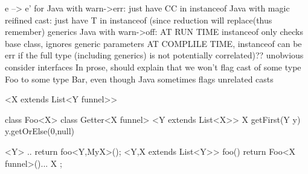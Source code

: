   e --> e' for 
  Java with warn->err: just have CC in instanceof
  Java with magic reifined cast: just have T in instanceof (since reduction will replace(thus remember) generics
  Java with warn->off:
        AT RUN TIME instanceof only checks base class, ignores generic parameters
        AT COMPLILE TIME, instanceof can be err if the full type (including generics) is not potentially correlated)?? unobvious consider interfaces
        In prose, should explain that we won't flag cast of some type Foo to some type Bar, even though Java sometimes flags unrelated casts

<X extends List<Y funnel>>

class Foo<X> {
    class Getter<X funnel> {
        <Y extends List<X>> X getFirst(Y y) { y.getOrElse(0,null) }
    }
}

<Y> .. return foo<Y,MyX>();
<Y,X extends List<Y>> foo(){ return Foo<X funnel>(){... X }; }
